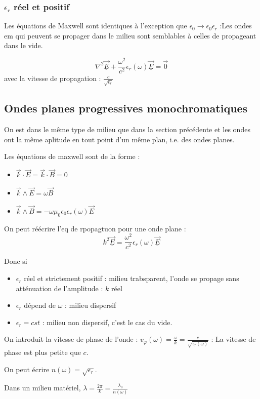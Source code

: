 \documentclass[french]{yLectureNote}
\renewcommand{\vec}{\overrightarrow}
\newcommand{\lap}{\nabla^2}
\begin{document}
\subsubsection{$\epsilon_r$ réel et positif}
Les équations de Maxwell sont identiques à l'exception que $\epsilon_0\to \epsilon_0\epsilon_r$ :Les ondes em qui peuvent se propager dans le milieu sont semblables à celles de propageant dans le vide.

$$\lap \vec{\underline{E}}+\frac{\omega^2}{c^2}\epsilon_r(\omega)\vec{\underline{E}}=\vec{0}$$
avec la vitesse de propagation : $\frac{c}{\sqrt{\epsilon_r}}$
\subsection{Ondes planes progressives monochromatiques}
On est dans le même type de milieu que dans la section précédente et les ondes ont la même aplitude en tout point d'un même plan, i.e. des ondes planes.

Les équations de maxwell sont de la forme :
\begin{itemize}
    \item $\vec{k}\cdot \vec{E} = \vec{k}\cdot \vec{B} = 0$
    \item $\vec{k}\wedge \vec{E} = \omega \vec{B}$
    \item $\vec{k}\wedge \vec{B} = -\omega \mu_0\epsilon_0\epsilon_r(\omega)\vec{E}$
\end{itemize}
 On peut réécrire l'eq de rpopagtuon pour une onde plane :
 $$k^2 \vec{\underline{E}} = \frac{\omega^2}{c^2}\epsilon_r(\omega)\vec{\underline{E}}$$
 
 Donc si 
 \begin{itemize}
    \item $\epsilon_r$ réel et strictement positif : milieu trabsparent, l'onde se propage sans atténuation de l'amplitude : $k$ réel
    \item $\epsilon_r$ dépend de $\omega$ : milieu dispersif
    \item $\epsilon_r =cst$ : milieu non dispersif, c'est le cas du vide.
 \end{itemize}
On introduit la vitesse de phase de l'onde :
$v_{\varphi}(\omega) = \frac{\omega}{k} = \frac{c}{\sqrt{\epsilon_r(\omega)}}$ : La vitesse de phase est plus petite que $c$.

On peut écrire $n(\omega) = \sqrt{\epsilon_r}$.

Dans un milieu matériel, $\lambda = \frac{2\pi}{k} = \frac{\lambda_0}{n(\omega)}$
\end{document}
